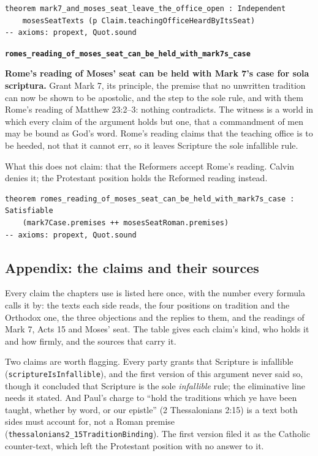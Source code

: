 \documentclass[11pt]{article}
\begin{document}
{\small\begin{verbatim}
theorem mark7_and_moses_seat_leave_the_office_open : Independent
    mosesSeatTexts (p Claim.teachingOfficeHeardByItsSeat)
-- axioms: propext, Quot.sound
\end{verbatim}}
\par\medskip\noindent\textbf{\texttt{romes\_\allowbreak{}reading\_\allowbreak{}of\_\allowbreak{}moses\_\allowbreak{}seat\_\allowbreak{}can\_\allowbreak{}be\_\allowbreak{}held\_\allowbreak{}with\_\allowbreak{}mark7s\_\allowbreak{}case}}\par\nobreak\noindent
\textbf{Rome’s reading of Moses’ seat can be held with Mark 7’s case for sola scriptura.} Grant Mark 7, its principle, the premise that no unwritten tradition can now be shown to be apostolic, and the step to the sole rule, and with them Rome’s reading of Matthew 23:2–3: nothing contradicts. The witness is a world in which every claim of the argument holds but one, that a commandment of men may be bound as God’s word. Rome’s reading claims that the teaching office is to be heeded, not that it cannot err, so it leaves Scripture the sole infallible rule.

What this does not claim: that the Reformers accept Rome’s reading. Calvin denies it; the Protestant position holds the Reformed reading instead.

{\small\begin{verbatim}
theorem romes_reading_of_moses_seat_can_be_held_with_mark7s_case : Satisfiable
    (mark7Case.premises ++ mosesSeatRoman.premises)
-- axioms: propext, Quot.sound
\end{verbatim}}
\subsection*{Appendix: the claims and their sources}
Every claim the chapters use is listed here once, with the number every formula calls it by: the texts each side reads, the four positions on tradition and the Orthodox one, the three objections and the replies to them, and the readings of Mark 7, Acts 15 and Moses’ seat. The table gives each claim’s kind, who holds it and how firmly, and the sources that carry it.

Two claims are worth flagging. Every party grants that Scripture is infallible (\texttt{scripture\allowbreak{}Is\allowbreak{}Infallible}), and the first version of this argument never said so, though it concluded that Scripture is the sole \emph{infallible} rule; the eliminative line needs it stated. And Paul’s charge to “hold the traditions which ye have been taught, whether by word, or our epistle” (2 Thessalonians 2:15) is a text both sides must account for, not a Roman premise (\texttt{thessalonians2\_\allowbreak{}15\allowbreak{}Tradition\allowbreak{}Binding}). The first version filed it as the Catholic counter-text, which left the Protestant position with no answer to it.
\end{document}
